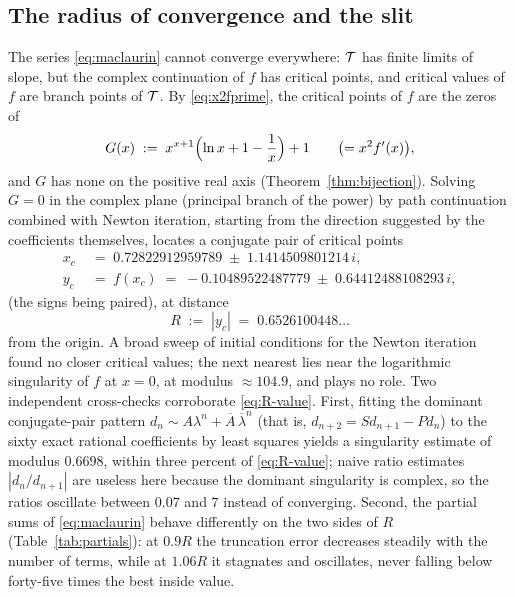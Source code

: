 \subsection{The radius of convergence and the slit}\label{subsec:radius}

The series \eqref{eq:maclaurin} cannot converge everywhere: $\mathcal{T}$ has
finite limits of slope, but the complex continuation of $f$ has
critical points, and critical values of $f$ are branch points of
$\mathcal{T}$. By \eqref{eq:x2fprime}, the critical points of $f$ are the
zeros of
\begin{equation}\label{eq:G-def}
    G(x) \;:=\; x^{x+1}\Bigl(\ln x + 1 - \frac{1}{x}\Bigr) + 1
    \qquad\bigl(= x^{2} f'(x)\bigr),
\end{equation}
and $G$ has none on the positive real axis (Theorem~\ref{thm:bijection}).
Solving $G = 0$ in the complex plane (principal branch of the power) by
path continuation combined with Newton iteration, starting from the
direction suggested by the coefficients themselves, locates a conjugate
pair of critical points
\begin{align*}
    x_{c} \;&=\; 0.72822912959789 \;\pm\; 1.1414509801214\,i, \\
    y_{c} \;&=\; f(x_{c}) \;=\; -0.10489522487779 \;\pm\; 0.64412488108293\,i,
\end{align*}
(the signs being paired), at distance
\begin{equation}\label{eq:R-value}
    R \;:=\; |y_{c}| \;=\; 0.6526100448\ldots
\end{equation}
from the origin. A broad sweep of initial conditions for the Newton
iteration found no closer critical values; the next nearest lies near
the logarithmic singularity of $f$ at $x = 0$, at modulus $\approx
104.9$, and plays no role. Two independent cross-checks corroborate
\eqref{eq:R-value}. First, fitting the dominant conjugate-pair pattern
$d_{n} \sim A\lambda^{n} + \overline{A}\,\overline{\lambda}^{n}$ (that
is, $d_{n+2} = S d_{n+1} - P d_{n}$) to the sixty exact rational
coefficients by least squares yields a singularity estimate of modulus
$0.6698$, within three percent of \eqref{eq:R-value}; naive ratio
estimates $|d_{n}/d_{n+1}|$ are useless here because the dominant
singularity is complex, so the ratios oscillate between $0.07$ and $7$
instead of converging. Second, the partial sums of \eqref{eq:maclaurin}
behave differently on the two sides of $R$ (Table~\ref{tab:partials}):
at $0.9R$ the truncation error decreases steadily with the number of
terms, while at $1.06R$ it stagnates and oscillates, never falling
below forty-five times the best inside value.

